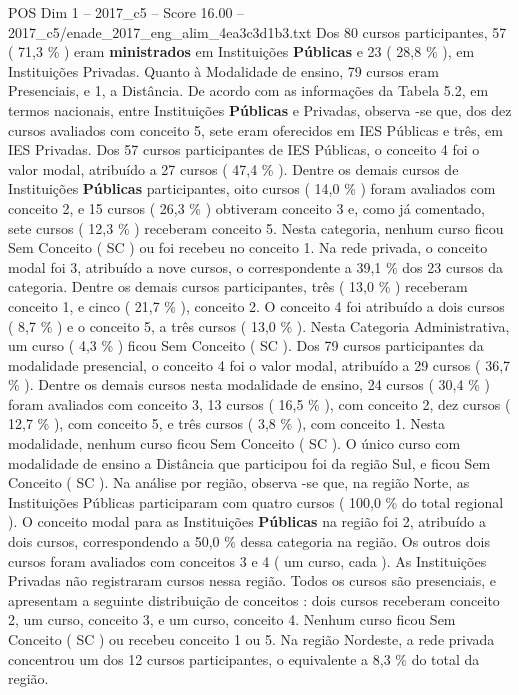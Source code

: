 \begin{textsample}{POS Dim 1 – 2017\_c5 – Score 16.00 – 2017\_c5/enade\_2017\_eng\_alim\_4ea3c3d1b3.txt}
Dos 80 cursos participantes, 57 ( 71,3 \% ) eram \textbf{ministrados} em Instituições \textbf{Públicas} e 23 ( 28,8 \% ), em Instituições Privadas.
Quanto à Modalidade de ensino, 79 cursos eram Presenciais, e 1, a Distância.
De acordo com as informações da Tabela 5.2, em termos nacionais, entre Instituições \textbf{Públicas} e Privadas, observa -se que, dos dez cursos avaliados com conceito 5, sete eram oferecidos em IES Públicas e três, em IES Privadas.
Dos 57 cursos participantes de IES Públicas, o conceito 4 foi o valor modal, atribuído a 27 cursos ( 47,4 \% ).
Dentre os demais cursos de Instituições \textbf{Públicas} participantes, oito cursos ( 14,0 \% ) foram avaliados com conceito 2, e 15 cursos ( 26,3 \% ) obtiveram conceito 3 e, como já comentado, sete cursos ( 12,3 \% ) receberam conceito 5.
Nesta categoria, nenhum curso ficou Sem Conceito ( SC ) ou foi recebeu no conceito 1.
Na rede privada, o conceito modal foi 3, atribuído a nove cursos, o correspondente a 39,1 \% dos 23 cursos da categoria.
Dentre os demais cursos participantes, três ( 13,0 \% ) receberam conceito 1, e cinco ( 21,7 \% ), conceito 2.
O conceito 4 foi atribuído a dois cursos ( 8,7 \% ) e o conceito 5, a três cursos ( 13,0 \% ).
Nesta Categoria Administrativa, um curso ( 4,3 \% ) ficou Sem Conceito ( SC ).
Dos 79 cursos participantes da modalidade presencial, o conceito 4 foi o valor modal, atribuído a 29 cursos ( 36,7 \% ).
Dentre os demais cursos nesta modalidade de ensino, 24 cursos ( 30,4 \% ) foram avaliados com conceito 3, 13 cursos ( 16,5 \% ), com conceito 2, dez cursos ( 12,7 \% ), com conceito 5, e três cursos ( 3,8 \% ), com conceito 1.
Nesta modalidade, nenhum curso ficou Sem Conceito ( SC ).
O único curso com modalidade de ensino a Distância que participou foi da região Sul, e ficou Sem Conceito ( SC ).
Na análise por região, observa -se que, na região Norte, as Instituições Públicas participaram com quatro cursos ( 100,0 \% do total regional ).
O conceito modal para as Instituições \textbf{Públicas} na região foi 2, atribuído a dois cursos, correspondendo a 50,0 \% dessa categoria na região.
Os outros dois cursos foram avaliados com conceitos 3 e 4 ( um curso, cada ).
As Instituições Privadas não registraram cursos nessa região.
Todos os cursos são presenciais, e apresentam a seguinte distribuição de conceitos : dois cursos receberam conceito 2, um curso, conceito 3, e um curso, conceito 4.
Nenhum curso ficou Sem Conceito ( SC ) ou recebeu conceito 1 ou 5.
Na região Nordeste, a rede privada concentrou um dos 12 cursos participantes, o equivalente a 8,3 \% do total da região.

\end{textsample}
